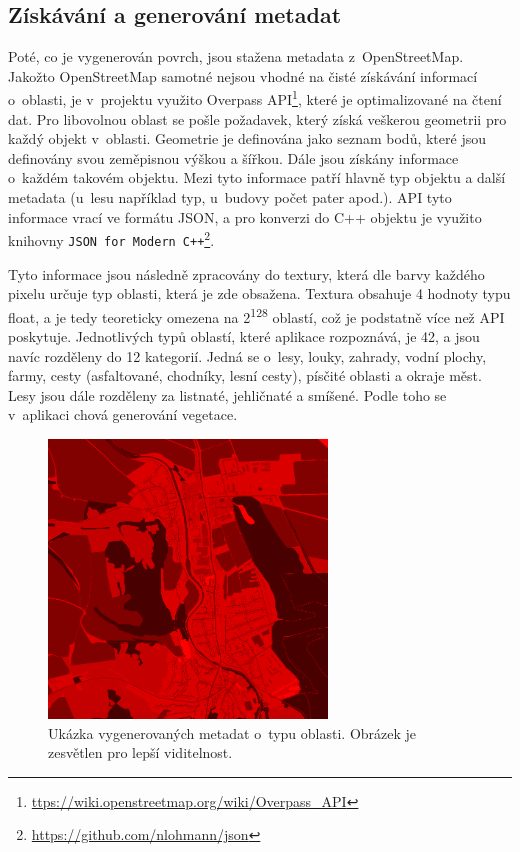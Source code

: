 \subsection*{Získávání a generování metadat} \label{impl-metadata-gen}
Poté, co je vygenerován povrch, jsou stažena metadata z~OpenStreetMap. Jakožto OpenStreetMap samotné nejsou vhodné na čisté získávání informací o~oblasti, je v~projektu využito Overpass API\footnote{\href{https://wiki.openstreetmap.org/wiki/Overpass_API}{ttps://wiki.openstreetmap.org/wiki/Overpass\_API}}, které je optimalizované na čtení dat. Pro libovolnou oblast se pošle požadavek, který získá veškerou geometrii pro každý objekt v~oblasti. Geometrie je definována jako seznam bodů, které jsou definovány svou zeměpisnou výškou a šířkou. Dále jsou získány informace o~každém takovém objektu. Mezi tyto informace patří hlavně typ objektu a další metadata (u~lesu například typ, u~budovy počet pater apod.). API tyto informace vrací ve formátu JSON, a pro konverzi do C++ objektu je využito knihovny \verb|JSON for Modern C++|\footnote{\href{https://github.com/nlohmann/json}{https://github.com/nlohmann/json}}. 

Tyto informace jsou následně zpracovány do textury, která dle barvy každého pixelu určuje typ oblasti, která je zde obsažena. Textura obsahuje 4 hodnoty typu float, a je tedy teoreticky omezena na 2\textsuperscript{128} oblastí, což je podstatně více než API poskytuje. Jednotlivých typů oblastí, které aplikace rozpoznává, je 42, a jsou navíc rozděleny do 12 kategorií. Jedná se o~lesy, louky, zahrady, vodní plochy, farmy, cesty (asfaltované, chodníky, lesní cesty), písčité oblasti a okraje měst. Lesy jsou dále rozděleny za listnaté, jehličnaté a smíšené. Podle toho se v~aplikaci chová generování vegetace.
\begin{figure}[H]
	\centering
	\includegraphics[width=20em]{images/impl/metadata.png}
	\caption[caption]{Ukázka vygenerovaných metadat o~typu oblasti. Obrázek je zesvětlen pro lepší viditelnost.} 
	\label{metadata-img}
\end{figure}

